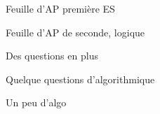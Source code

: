 
\begin{feuilleExo}{Feuille d'AP première ES}
\end{feuilleExo}


\begin{feuilleExo}{Feuille d'AP de seconde, logique}
\end{feuilleExo}

\begin{feuilleExo}{Des questions en plus}

\vspace{2cm}

\end{feuilleExo}


\begin{feuilleExo}{Quelque questions d'algorithmique}
\end{feuilleExo}

\begin{feuilleExo}{Un peu d'algo}
\end{feuilleExo}



